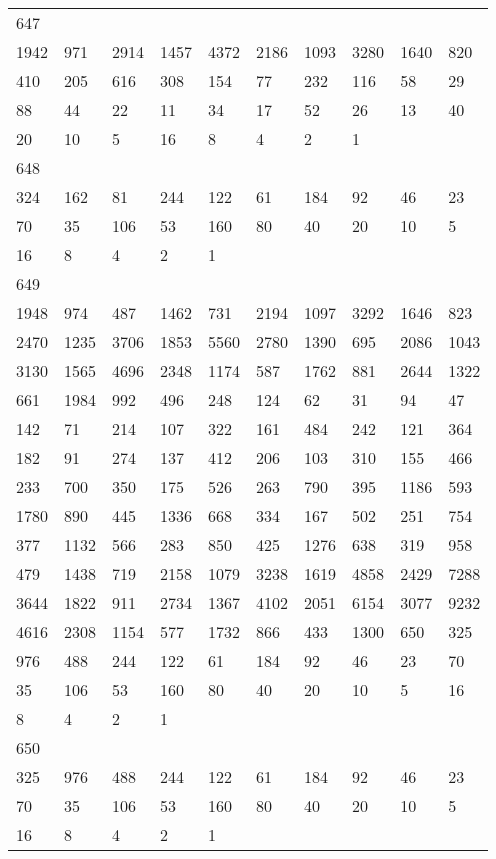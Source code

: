\begin{longtable}{*{10}{l}}
647&&&&&&&&&\\
1942& 971& 2914& 1457& 4372& 2186& 1093& 3280& 1640& 820\\
410& 205& 616& 308& 154& 77& 232& 116& 58& 29\\
88& 44& 22& 11& 34& 17& 52& 26& 13& 40\\
20& 10& 5& 16& 8& 4& 2& 1& \\

648&&&&&&&&&\\
324& 162& 81& 244& 122& 61& 184& 92& 46& 23\\
70& 35& 106& 53& 160& 80& 40& 20& 10& 5\\
16& 8& 4& 2& 1& \\

649&&&&&&&&&\\
1948& 974& 487& 1462& 731& 2194& 1097& 3292& 1646& 823\\
2470& 1235& 3706& 1853& 5560& 2780& 1390& 695& 2086& 1043\\
3130& 1565& 4696& 2348& 1174& 587& 1762& 881& 2644& 1322\\
661& 1984& 992& 496& 248& 124& 62& 31& 94& 47\\
142& 71& 214& 107& 322& 161& 484& 242& 121& 364\\
182& 91& 274& 137& 412& 206& 103& 310& 155& 466\\
233& 700& 350& 175& 526& 263& 790& 395& 1186& 593\\
1780& 890& 445& 1336& 668& 334& 167& 502& 251& 754\\
377& 1132& 566& 283& 850& 425& 1276& 638& 319& 958\\
479& 1438& 719& 2158& 1079& 3238& 1619& 4858& 2429& 7288\\
3644& 1822& 911& 2734& 1367& 4102& 2051& 6154& 3077& 9232\\
4616& 2308& 1154& 577& 1732& 866& 433& 1300& 650& 325\\
976& 488& 244& 122& 61& 184& 92& 46& 23& 70\\
35& 106& 53& 160& 80& 40& 20& 10& 5& 16\\
8& 4& 2& 1& \\

650&&&&&&&&&\\
325& 976& 488& 244& 122& 61& 184& 92& 46& 23\\
70& 35& 106& 53& 160& 80& 40& 20& 10& 5\\
16& 8& 4& 2& 1& \\


\end{longtable}
